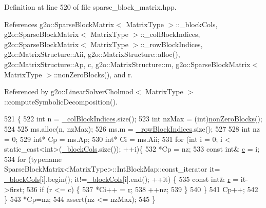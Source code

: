 Definition at line 520 of file sparse\+\_\+block\+\_\+matrix.\+hpp.



References g2o\+::\+Sparse\+Block\+Matrix$<$ Matrix\+Type $>$\+::\+\_\+block\+Cols, g2o\+::\+Sparse\+Block\+Matrix$<$ Matrix\+Type $>$\+::\+\_\+col\+Block\+Indices, g2o\+::\+Sparse\+Block\+Matrix$<$ Matrix\+Type $>$\+::\+\_\+row\+Block\+Indices, g2o\+::\+Matrix\+Structure\+::\+Aii, g2o\+::\+Matrix\+Structure\+::alloc(), g2o\+::\+Matrix\+Structure\+::\+Ap, c, g2o\+::\+Matrix\+Structure\+::m, g2o\+::\+Sparse\+Block\+Matrix$<$ Matrix\+Type $>$\+::non\+Zero\+Blocks(), and r.



Referenced by g2o\+::\+Linear\+Solver\+Cholmod$<$ Matrix\+Type $>$\+::compute\+Symbolic\+Decomposition().


\begin{DoxyCode}
521   \{
522     \textcolor{keywordtype}{int} n     = \hyperlink{classg2o_1_1SparseBlockMatrix_aca008740c37d2d00b90f696ab19abb59}{\_colBlockIndices}.size();
523     \textcolor{keywordtype}{int} nzMax = (int)\hyperlink{classg2o_1_1SparseBlockMatrix_a4e2ecdfdec3b47b2f9373c56aecc7d15}{nonZeroBlocks}();
524 
525     ms.alloc(n, nzMax);
526     ms.m = \hyperlink{classg2o_1_1SparseBlockMatrix_ab0bd9c6d5b7b8704af1bc679032382e3}{\_rowBlockIndices}.size();
527 
528     \textcolor{keywordtype}{int} nz = 0;
529     \textcolor{keywordtype}{int}* Cp = ms.Ap;
530     \textcolor{keywordtype}{int}* Ci = ms.Aii;
531     \textcolor{keywordflow}{for} (\textcolor{keywordtype}{int} i = 0; i < static\_cast<int>(\hyperlink{classg2o_1_1SparseBlockMatrix_ae236d56a01ba4d292450a518621b41f8}{\_blockCols}.size()); ++i)\{
532       *Cp = nz;
533       \textcolor{keyword}{const} \textcolor{keywordtype}{int}& \hyperlink{sparse__block__matrix_8hpp_a4e1e0e72dd773439e333c84dd762a9c3}{c} = i;
534       \textcolor{keywordflow}{for} (\textcolor{keyword}{typename} SparseBlockMatrix<MatrixType>::IntBlockMap::const\_iterator it=
      \hyperlink{classg2o_1_1SparseBlockMatrix_ae236d56a01ba4d292450a518621b41f8}{\_blockCols}[i].begin(); it!=\hyperlink{classg2o_1_1SparseBlockMatrix_ae236d56a01ba4d292450a518621b41f8}{\_blockCols}[i].end(); ++it) \{
535         \textcolor{keyword}{const} \textcolor{keywordtype}{int}& \hyperlink{sparse__block__matrix_8hpp_acab531abaa74a7e664e3986f2522b33a}{r} = it->first;
536         \textcolor{keywordflow}{if} (r <= c) \{
537           *Ci++ = \hyperlink{sparse__block__matrix_8hpp_acab531abaa74a7e664e3986f2522b33a}{r};
538           ++nz;
539         \}
540       \}
541       Cp++;
542     \}
543     *Cp=nz;
544     assert(nz <= nzMax);
545   \}
\end{DoxyCode}
